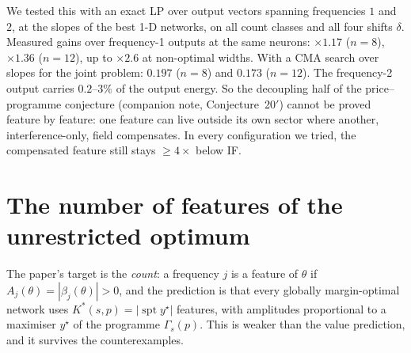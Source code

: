 \documentclass[11pt]{article}
\theoremstyle{definition}
\begin{document}
We tested this with an exact LP over output vectors spanning frequencies $1$ and $2$, at the slopes of the best 1-D networks,
on all count classes and all four shifts $\delta$.  Measured gains over frequency-1 outputs at the same neurons: $\times1.17$
($n=8$), $\times1.36$ ($n=12$), up to $\times2.6$ at non-optimal widths.  With a CMA search over slopes for the joint problem:
$0.197$ ($n=8$) and $0.173$ ($n=12$).  The frequency-2 output carries $0.2$--$3\%$ of the output energy.  So the decoupling half of
the price--programme conjecture (companion note, Conjecture~20$'$) cannot be proved feature by feature: one feature can live outside its own sector where
another, interference-only, field compensates.  In every configuration we tried, the compensated feature still stays
$\ge4\times$ below IF.

\section{The number of features of the unrestricted optimum}\label{sec:count}
The paper's target is the \emph{count}: a frequency $j$ is a feature of $\theta$ if $A_j(\theta)=|\beta_j(\theta)|>0$, and the
prediction is that every globally margin-optimal network uses $K^*(s,p)=|\operatorname{spt}y^\star|$ features, with
amplitudes proportional to a maximiser $y^\star$ of the programme $\Gamma_s(p)$.  This is weaker than the value prediction,
and it survives the counterexamples.
\end{document}
